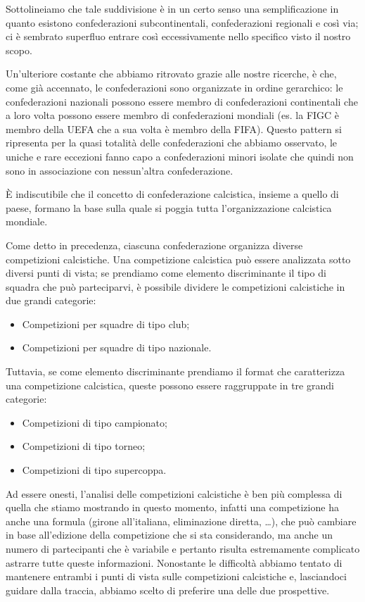 Sottolineiamo che tale suddivisione è in un certo senso una semplificazione in quanto
esistono confederazioni subcontinentali, confederazioni regionali e così via; ci è sembrato
superfluo entrare così eccessivamente nello specifico visto il nostro scopo.

Un'ulteriore costante che abbiamo ritrovato grazie alle nostre ricerche, è che,
come già accennato, le confederazioni sono organizzate in ordine gerarchico: le confederazioni
nazionali possono essere membro di confederazioni continentali che a loro volta possono essere
membro di confederazioni mondiali (es. la FIGC è membro della UEFA che a sua volta è membro
della FIFA).
Questo pattern si ripresenta per la quasi totalità delle confederazioni che abbiamo osservato,
le uniche e rare eccezioni fanno capo a confederazioni minori isolate che quindi non sono in
associazione con nessun'altra confederazione.

È indiscutibile che il concetto di confederazione calcistica, insieme a quello di paese,
formano la base sulla quale si poggia tutta l'organizzazione calcistica mondiale.

\bigskip
\bigskip

Come detto in precedenza, ciascuna confederazione organizza diverse competizioni calcistiche.
Una competizione calcistica può essere analizzata sotto diversi punti di vista;
se prendiamo come elemento discriminante il tipo di squadra che può parteciparvi, è possibile
dividere le competizioni calcistiche in due grandi categorie:
\begin{itemize}
	\item Competizioni per squadre di tipo club;
	\item Competizioni per squadre di tipo nazionale.
\end{itemize}

Tuttavia, se come elemento discriminante prendiamo il format che caratterizza una competizione
calcistica, queste possono essere raggruppate in tre grandi categorie:
\begin{itemize}
	\item Competizioni di tipo campionato;
	\item Competizioni di tipo torneo;
	\item Competizioni di tipo supercoppa.
\end{itemize}

Ad essere onesti, l'analisi delle competizioni calcistiche è ben più complessa di quella
che stiamo mostrando in questo momento, infatti una competizione ha anche una formula
(girone all'italiana, eliminazione diretta, \dots),
che può cambiare in base all'edizione della competizione che si sta considerando,
ma anche un numero di partecipanti che è variabile e pertanto risulta estremamente
complicato astrarre tutte queste informazioni.
Nonostante le difficoltà abbiamo tentato di mantenere entrambi i punti di vista sulle
competizioni calcistiche e, lasciandoci guidare dalla traccia, abbiamo scelto di preferire una
delle due prospettive.

